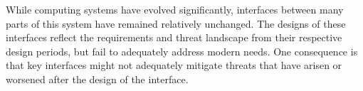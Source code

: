 While computing systems have evolved significantly, interfaces between many 
parts of this system have remained relatively unchanged.
The designs of these interfaces reflect the requirements and threat landscape
from their respective design periods, but fail to adequately address modern
needs.
One consequence is that key interfaces might not adequately mitigate threats
that have arisen or worsened after the design of the interface.
